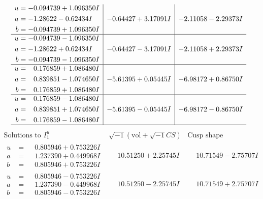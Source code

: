 \documentclass[1p]{elsarticle_modified}
\theoremstyle{definition}
\newcommand{\I}{\sqrt{-1}}
\begin{document}
$$\begin{array}{c|c|c}
\begin{aligned}
u &= -0.094739 + 1.096350 I \\
a &= -1.28622 - 0.62434 I \\
b &= -0.094739 + 1.096350 I\end{aligned}
 & -0.64427 + 3.17091 I & -2.11058 - 2.29373 I \\ \hline\begin{aligned}
u &= -0.094739 - 1.096350 I \\
a &= -1.28622 + 0.62434 I \\
b &= -0.094739 - 1.096350 I\end{aligned}
 & -0.64427 - 3.17091 I & -2.11058 + 2.29373 I \\ \hline\begin{aligned}
u &= \phantom{-}0.176859 + 1.086480 I \\
a &= \phantom{-}0.839851 - 1.074650 I \\
b &= \phantom{-}0.176859 + 1.086480 I\end{aligned}
 & -5.61395 + 0.05445 I & -6.98172 + 0.86750 I \\ \hline\begin{aligned}
u &= \phantom{-}0.176859 - 1.086480 I \\
a &= \phantom{-}0.839851 + 1.074650 I \\
b &= \phantom{-}0.176859 - 1.086480 I\end{aligned}
 & -5.61395 - 0.05445 I & -6.98172 - 0.86750 I\\
 \hline 
 \end{array}$$\newpage$$\begin{array}{c|c|c}  
\text{Solutions to }I^u_{1}& \I (\text{vol} + \sqrt{-1}CS) & \text{Cusp shape}\\
 \hline 
\begin{aligned}
u &= \phantom{-}0.805946 + 0.753226 I \\
a &= \phantom{-}1.237390 + 0.449968 I \\
b &= \phantom{-}0.805946 + 0.753226 I\end{aligned}
 & \phantom{-}10.51250 + 2.25745 I & \phantom{-}10.71549 - 2.75707 I \\ \hline\begin{aligned}
u &= \phantom{-}0.805946 - 0.753226 I \\
a &= \phantom{-}1.237390 - 0.449968 I \\
b &= \phantom{-}0.805946 - 0.753226 I\end{aligned}
 & \phantom{-}10.51250 - 2.25745 I & \phantom{-}10.71549 + 2.75707 I \\ \hline\begin{aligned}

\end{aligned}
\end{array}$$
\end{document}
